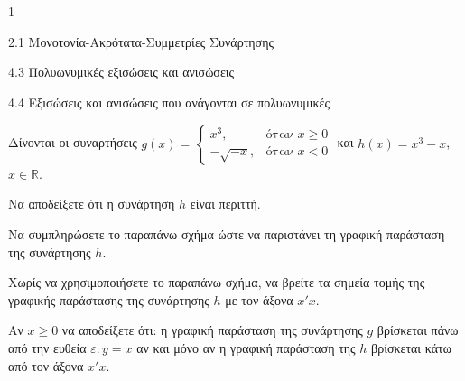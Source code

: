 \begin{ylh}{1}
\item 2.1 Μονοτονία-Ακρότατα-Συμμετρίες Συνάρτησης
\item 4.3 Πολυωνυμικές εξισώσεις και ανισώσεις
\item 4.4 Εξισώσεις και ανισώσεις που ανάγονται σε πολυωνυμικές
\end{ylh}
Δίνονται οι συναρτήσεις $g(x) = \begin{cases} x^3, & \text{όταν } x \geq 0 \\ -\sqrt{-x}, & \text{όταν } x < 0 \end{cases}$ και $h(x) = x^3 - x$, $x \in \mathbb{R}$.
\begin{center}
\end{center}
\begin{alist}
\item Να αποδείξετε ότι η συνάρτηση $h$ είναι περιττή.
\item Να συμπληρώσετε το παραπάνω σχήμα ώστε να παριστάνει τη γραφική παράσταση της συνάρτησης $h$.
\item Χωρίς να χρησιμοποιήσετε το παραπάνω σχήμα, να βρείτε τα σημεία τομής της γραφικής παράστασης της συνάρτησης $h$ με τον άξονα $x'x$.
\item Αν $x \geq 0$ να αποδείξετε ότι: η γραφική παράσταση της συνάρτησης $g$ βρίσκεται πάνω από την ευθεία $\varepsilon: y = x$ αν και μόνο αν η γραφική παράσταση της $h$ βρίσκεται κάτω από τον άξονα $x'x$.
\end{alist}

